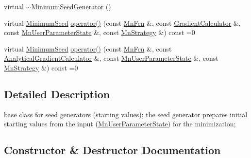 \begin{DoxyCompactItemize}
\item 
virtual \mbox{\hyperlink{classROOT_1_1Minuit2_1_1MinimumSeedGenerator_a8dba99d17a2ee712dfd6d602c80ec423}{$\sim$\+Minimum\+Seed\+Generator}} ()
\item 
virtual \mbox{\hyperlink{classROOT_1_1Minuit2_1_1MinimumSeed}{Minimum\+Seed}} \mbox{\hyperlink{classROOT_1_1Minuit2_1_1MinimumSeedGenerator_ae71de52027d3f0c7fa202c7cf65b947a}{operator()}} (const \mbox{\hyperlink{classROOT_1_1Minuit2_1_1MnFcn}{Mn\+Fcn}} \&, const \mbox{\hyperlink{classROOT_1_1Minuit2_1_1GradientCalculator}{Gradient\+Calculator}} \&, const \mbox{\hyperlink{classROOT_1_1Minuit2_1_1MnUserParameterState}{Mn\+User\+Parameter\+State}} \&, const \mbox{\hyperlink{classROOT_1_1Minuit2_1_1MnStrategy}{Mn\+Strategy}} \&) const =0
\item 
virtual \mbox{\hyperlink{classROOT_1_1Minuit2_1_1MinimumSeed}{Minimum\+Seed}} \mbox{\hyperlink{classROOT_1_1Minuit2_1_1MinimumSeedGenerator_a670b9671c73d7e0d3caa148e82d4b2fa}{operator()}} (const \mbox{\hyperlink{classROOT_1_1Minuit2_1_1MnFcn}{Mn\+Fcn}} \&, const \mbox{\hyperlink{classROOT_1_1Minuit2_1_1AnalyticalGradientCalculator}{Analytical\+Gradient\+Calculator}} \&, const \mbox{\hyperlink{classROOT_1_1Minuit2_1_1MnUserParameterState}{Mn\+User\+Parameter\+State}} \&, const \mbox{\hyperlink{classROOT_1_1Minuit2_1_1MnStrategy}{Mn\+Strategy}} \&) const =0
\end{DoxyCompactItemize}


\subsection{Detailed Description}
base class for seed generators (starting values); the seed generator prepares initial starting values from the input (\mbox{\hyperlink{classROOT_1_1Minuit2_1_1MnUserParameterState}{Mn\+User\+Parameter\+State}}) for the minimization; 

\subsection{Constructor \& Destructor Documentation}
\mbox{\label{classROOT_1_1Minuit2_1_1MinimumSeedGenerator_a8dba99d17a2ee712dfd6d602c80ec423}} 
